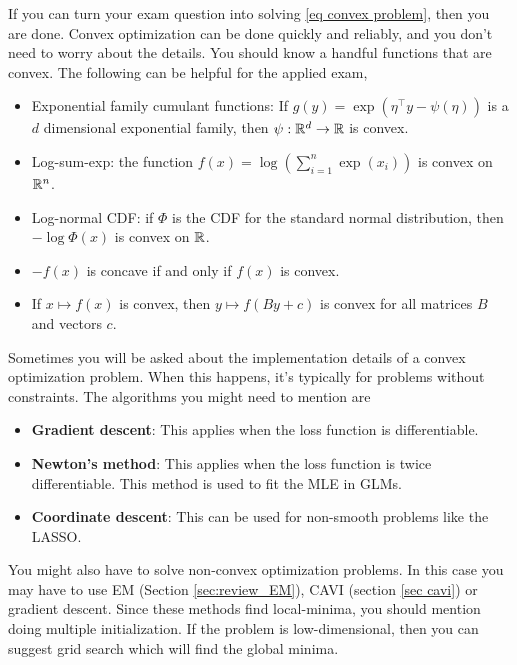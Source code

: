 If you can turn your exam question into solving \eqref{eq convex problem}, then you are done. Convex optimization can be done quickly and reliably, and you don't need to worry about the details. You should know a handful functions that are convex. The following can be helpful for the applied exam,
\begin{itemize}
    \item Exponential family cumulant functions: If $g(y) = \exp(\eta^\top y-\psi(\eta))$ is a $d$ dimensional exponential family, then $\psi : \mathbb{R}^d \to \mathbb{R}$ is convex.
    \item Log-sum-exp: the function $f(x) = \log \left(\sum_{i=1}^n\exp(x_i)\right)$ is convex on $\mathbb{R}^n$.
    \item Log-normal CDF: if $\Phi$ is the CDF for the standard normal distribution, then $-\log \Phi(x)$ is convex on $\mathbb{R}$.
    \item $-f(x)$ is concave if and only if $f(x)$ is convex.
    \item If $x \mapsto f(x)$ is convex, then $y \mapsto f(By+c)$ is convex for all matrices $B$ and vectors $c$.
\end{itemize}
Sometimes you will be asked about the implementation details of a convex optimization problem. When this happens, it's typically for problems without constraints. The algorithms you might need to mention are
\begin{itemize}
    \item \textbf{Gradient descent}: This applies when the loss function is differentiable.
    \item \textbf{Newton's method}: This applies when the loss function is twice differentiable. This method is used to fit the MLE in GLMs.
    \item \textbf{Coordinate descent}: This can be used for non-smooth problems like the LASSO.
\end{itemize}
You might also have to solve non-convex optimization problems. In this case you may have to use EM (Section \ref{sec:review_EM}), CAVI (section \ref{sec cavi}) or gradient descent. Since these methods find local-minima, you should mention doing multiple initialization. If the problem is low-dimensional, then you can suggest grid search which will find the global minima. 